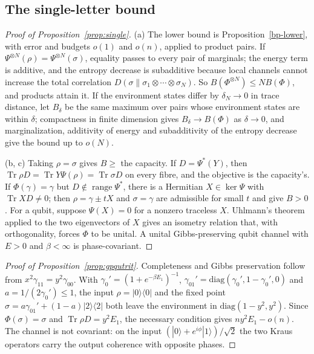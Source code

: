 \documentclass[11pt]{article}
\theoremstyle{definition}
\theoremstyle{remark}
\newcommand{\Tr}{\operatorname{Tr}}
\begin{document}
\subsection{The single-letter bound}\label{pf:single}

\begin{proof}[Proof of Proposition~\ref{prop:single}]
(a) The lower bound is Proposition~\ref{bp-lower}, with error and budgets $o(1)$ and $o(n)$, applied to product pairs. If $\Psi^{\otimes N}(\rho)=\Psi^{\otimes N}(\sigma)$, equality passes to every pair of marginals; the energy term is additive, and the entropy decrease is subadditive because local channels cannot increase the total correlation $D(\sigma\|\sigma_1\otimes\cdots\otimes\sigma_N)$. So $B(\Phi^{\otimes N})\le NB(\Phi)$, and products attain it. If the environment states differ by $\delta_N\to0$ in trace distance, let $B_\delta$ be the same maximum over pairs whose environment states are within $\delta$; compactness in finite dimension gives $B_\delta\to B(\Phi)$ as $\delta\to0$, and marginalization, additivity of energy and subadditivity of the entropy decrease give the bound up to $o(N)$.

(b, c) Taking $\rho=\sigma$ gives $B\ge$ the capacity. If $D=\Psi^*(Y)$, then $\Tr\rho D=\Tr Y\Psi(\rho)=\Tr\sigma D$ on every fibre, and the objective is the capacity's. If $\Phi(\gamma)=\gamma$ but $D\notin\operatorname{range}\Psi^*$, there is a Hermitian $X\in\ker\Psi$ with $\Tr XD\neq0$; then $\rho=\gamma\pm tX$ and $\sigma=\gamma$ are admissible for small $t$ and give $B>0$. For a qubit, suppose $\Psi(X)=0$ for a nonzero traceless $X$. Uhlmann's theorem applied to the two eigenvectors of $X$ gives an isometry relation that, with orthogonality, forces $\Phi$ to be unital. A unital Gibbs-preserving qubit channel with $E>0$ and $\beta<\infty$ is phase-covariant.

\end{proof}

\begin{proof}[Proof of Proposition~\ref{prop:gpqutrit}]
Completeness and Gibbs preservation follow from $x^2\gamma_{11}=y^2\gamma_{00}$. With $\gamma_0'=(1+e^{-\beta E_1})^{-1}$, $\gamma_{01}'=\mathrm{diag}(\gamma_0',1-\gamma_0',0)$ and $a=1/(2\gamma_0')\le1$, the input $\rho=|0\rangle\langle0|$ and the fixed point $\sigma=a\gamma_{01}'+(1-a)|2\rangle\langle2|$ both leave the environment in $\mathrm{diag}(1-y^2,y^2)$. Since $\Phi(\sigma)=\sigma$ and $\Tr\rho D=y^2E_1$, the necessary condition gives $ny^2E_1-o(n)$. The channel is not covariant: on the input $(|0\rangle+e^{i\phi}|1\rangle)/\sqrt2$ the two Kraus operators carry the output coherence with opposite phases.
\end{proof}
\end{document}
